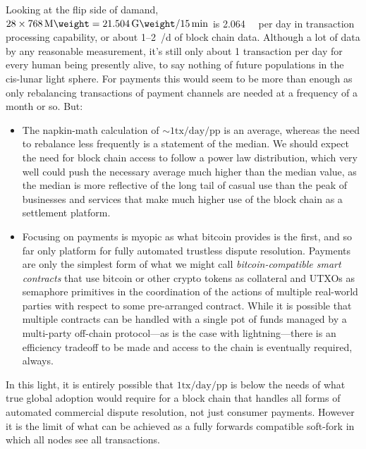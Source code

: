 Looking at the flip side of damand, $28 \times \SI{768}{\mega\weight}
= \SI{21.504}{\giga\weight} / \SI{15}{\min}$ is
\SI{2.064}{\tera\weight} per day in transaction processing capability,
or about \numrange{1}{2}\si[per-mode=symbol]{\tera\byte\per\day} of
block chain data.  Although a lot of data by any reasonable
measurement, it's still only about \num{1} transaction per day for
every human being presently alive, to say nothing of future
populations in the cis-lunar light sphere.  For payments this would
seem to be more than enough as only rebalancing transactions of
payment channels are needed at a frequency of a month or so.  But:

\begin{itemize}

  \item

    The napkin-math calculation of
    $\sim1\mathrm{tx}/\mathrm{day}/\mathrm{pp}$ is an average, whereas
    the need to rebalance less frequently is a statement of the
    median.  We should expect the need for block chain access to
    follow a power law distribution, which very well could push the
    necessary average much higher than the median value, as the median
    is more reflective of the long tail of casual use than the peak of
    businesses and services that make much higher use of the block
    chain as a settlement platform.

  \item

    Focusing on payments is myopic as what bitcoin provides is the
    first, and so far only platform for fully automated trustless
    dispute resolution.  Payments are only the simplest form of what
    we might call \emph{bitcoin-compatible smart contracts} that use
    bitcoin or other crypto tokens as collateral and UTXOs as
    semaphore primitives in the coordination of the actions of
    multiple real-world parties with respect to some pre-arranged
    contract.  While it is possible that multiple contracts can be
    handled with a single pot of funds managed by a multi-party
    off-chain protocol---as is the case with lightning---there is an
    efficiency tradeoff to be made and access to the chain is
    eventually required, always.

\end{itemize}

In this light, it is entirely possible that
$1\mathrm{tx}/\mathrm{day}/\mathrm{pp}$ is below the needs of what
true global adoption would require for a block chain that handles all
forms of automated commercial dispute resolution, not just consumer
payments.  However it is the limit of what can be achieved as a fully
forwards compatible soft-fork in which all nodes see all transactions.

